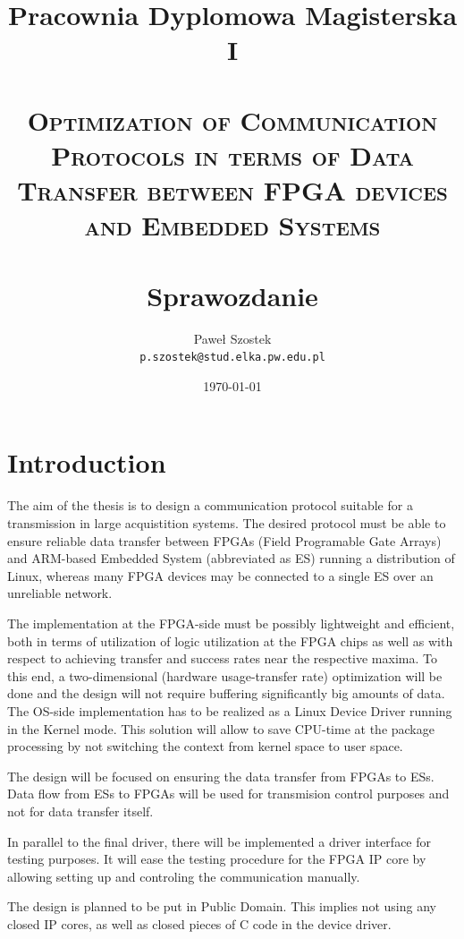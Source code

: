 \documentclass[12pt,a4paper]{article}
\begin{document}
\title{\textrm{Pracownia Dyplomowa Magisterska I} \\\mbox{}\\ \textsc{Optimization of Communication Protocols in terms of Data Transfer between FPGA devices and Embedded Systems} \\\mbox{} \\ \textrm{Sprawozdanie}}
\author{Paweł Szostek \\
\texttt{p.szostek@stud.elka.pw.edu.pl}
}
\date{\today}
\maketitle
\section{Introduction}
The aim of the thesis is to design a communication protocol suitable for a transmission in large acquistition systems. The desired protocol must be able to ensure reliable data transfer between FPGAs (Field Programable Gate Arrays) and ARM-based Embedded System (abbreviated as ES) running a distribution of Linux, whereas many FPGA devices may be connected to a single ES over an unreliable network.

The implementation at the FPGA-side must be possibly lightweight and efficient, both in terms of utilization of logic utilization at the FPGA chips as well as with respect to achieving transfer and success rates near the respective maxima. To this end, a two-dimensional (hardware usage-transfer rate) optimization will be done and the design will not require buffering significantly big amounts of data.
The OS-side implementation has to be realized as a Linux Device Driver running in the Kernel mode. This solution will allow to save CPU-time at the package processing by not switching the context from kernel space to user space.

The design will be focused on ensuring the data transfer from FPGAs to ESs. Data flow from ESs to FPGAs will be used for transmision control purposes and not for data transfer itself. 

In parallel to the final driver, there will be implemented a driver interface for testing purposes. It will ease the testing procedure for the FPGA IP core by allowing setting up and controling the communication manually.

The design is planned to be put in Public Domain. This implies not using any closed IP cores, as well as closed pieces of C code in the device driver.
\end{document}
